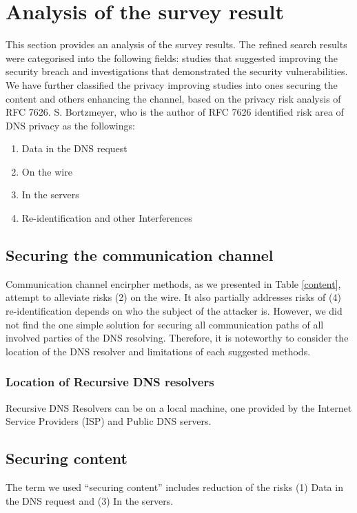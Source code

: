 \documentclass[a4paper,12pt]{article}
\begin{document}
\section{Analysis of the survey result}
This section provides an analysis of the survey results.
The refined search results were categorised into the following fields: studies that suggested improving the security breach and investigations that demonstrated the security vulnerabilities.
We have further classified the privacy improving studies into ones securing the content and others enhancing the channel, based on the privacy risk analysis of RFC 7626.
S. Bortzmeyer, who is the author of RFC 7626 identified risk area of DNS privacy as the followings\cite{rfc7626}: 
\begin{enumerate}
    \item Data in the DNS request
    \item On the wire
    \item In the servers
    \item Re-identification and other Interferences
\end{enumerate}

\subsection{Securing the communication channel}
Communication channel encirpher methods, as we presented in Table \ref{content}, attempt to alleviate risks (2) on the wire. It also partially addresses risks of (4) re-identification depends on who the subject of the attacker is. 
However, we did not find the one simple solution for securing all communication paths of all involved parties of the DNS resolving. Therefore, it is noteworthy to consider the location of the DNS resolver and limitations of each suggested methods.

\subsubsection{Location of Recursive DNS resolvers}
Recursive DNS Resolvers can be on a local machine, one provided by the Internet Service Providers (ISP) and Public DNS servers. 

\subsection{Securing content}
The term we used ``securing content'' includes reduction of the risks (1) Data in the DNS request and (3) In the servers. 
\end{document}

